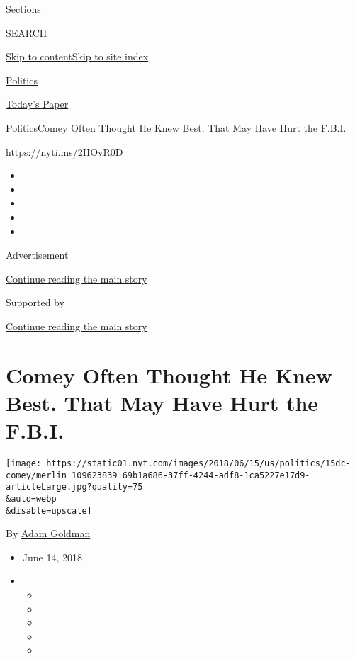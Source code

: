 Sections

SEARCH

\protect\hyperlink{site-content}{Skip to
content}\protect\hyperlink{site-index}{Skip to site index}

\href{https://www.nytimes.com/section/politics}{Politics}

\href{https://myaccount.nytimes.com/auth/login?response_type=cookie\&client_id=vi}{}

\href{https://www.nytimes.com/section/todayspaper}{Today's Paper}

\href{/section/politics}{Politics}\textbar{}Comey Often Thought He Knew
Best. That May Have Hurt the F.B.I.

\url{https://nyti.ms/2HOvR0D}

\begin{itemize}
\item
\item
\item
\item
\item
\end{itemize}

Advertisement

\protect\hyperlink{after-top}{Continue reading the main story}

Supported by

\protect\hyperlink{after-sponsor}{Continue reading the main story}

\hypertarget{comey-often-thought-he-knew-best-that-may-have-hurt-the-fbi}{%
\section{Comey Often Thought He Knew Best. That May Have Hurt the
F.B.I.}\label{comey-often-thought-he-knew-best-that-may-have-hurt-the-fbi}}

\texttt{[image: https://static01.nyt.com/images/2018/06/15/us/politics/15dc-comey/merlin\_109623839\_69b1a686-37ff-4244-adf8-1ca5227e17d9-articleLarge.jpg?quality=75\\\&auto=webp\\\&disable=upscale]}

By \href{https://www.nytimes.com/by/adam-goldman}{Adam Goldman}

\begin{itemize}
\item
  June 14, 2018
\item
  \begin{itemize}
  \item
  \item
  \item
  \item
  \item
  \end{itemize}
\end{itemize}

